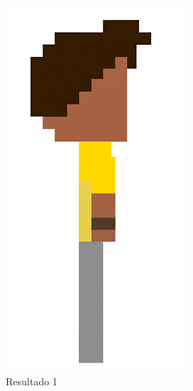 \begin{figure}[htbp]
\begin{subfigure}{0.23\linewidth}
        \includegraphics[width=1\linewidth]{figs/geminiPro/chat5/tela3_res1.PNG}
        \caption{\small Resultado 1}
        \label{fig:geminiPro9a}
    \end{subfigure}
    \begin{subfigure}{0.23\linewidth}

\end{subfigure}
\end{figure}
